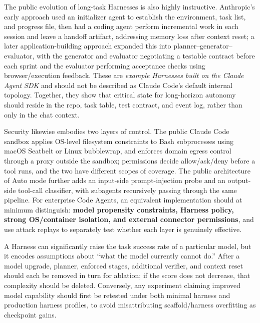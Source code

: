 \documentclass[10pt,a4paper,UTF8,fontset=none]{ctexart}
\begin{document}
The public evolution of long-task Harnesses is also highly instructive. Anthropic's early approach used an initializer agent to establish the environment, task list, and progress file, then had a coding agent perform incremental work in each session and leave a handoff artifact, addressing memory loss after context reset\cite{en:anthropic2025longharness}; a later application-building approach expanded this into planner--generator--evaluator, with the generator and evaluator negotiating a testable contract before each sprint and the evaluator performing acceptance checks using browser/execution feedback\cite{en:anthropic2026harnessdesign}. These are \emph{example Harnesses built on the Claude Agent SDK} and should not be described as Claude Code's default internal topology. Together, they show that critical state for long-horizon autonomy should reside in the repo, task table, test contract, and event log, rather than only in the chat context.

Security likewise embodies two layers of control. The public Claude Code sandbox applies OS-level filesystem constraints to Bash subprocesses using macOS Seatbelt or Linux bubblewrap, and enforces domain egress control through a proxy outside the sandbox; permissions decide allow/ask/deny before a tool runs, and the two have different scopes of coverage\cite{en:claudecodesandbox2026}. The public architecture of Auto mode further adds an input-side prompt-injection probe and an output-side tool-call classifier, with subagents recursively passing through the same pipeline\cite{en:anthropic2026automode}. For enterprise Code Agents, an equivalent implementation should at minimum distinguish: \textbf{model propensity constraints, Harness policy, strong OS/container isolation, and external connector permissions}, and use attack replays to separately test whether each layer is genuinely effective.

\begin{keybox}
A Harness can significantly raise the task success rate of a particular model, but it encodes assumptions about ``what the model currently cannot do.'' After a model upgrade, planner, enforced stages, additional verifier, and context reset should each be removed in turn for ablation; if the score does not decrease, that complexity should be deleted. Conversely, any experiment claiming improved model capability should first be retested under both minimal harness and production harness profiles, to avoid misattributing scaffold/harness overfitting as checkpoint gains.
\end{keybox}
\end{document}
